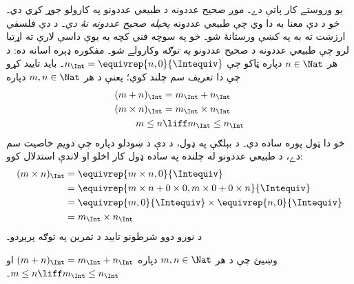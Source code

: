 \documentclass[../../../include/open-logic-section]{subfiles}
\begin{document}
يو وروستے کار پاتې دے۔ موږ صحيح عددونه د طبيعي عددونو په
کارولو جوړ کړي دي۔ خو د دې معنا به دا وي چې طبيعي عددونه \emph{پخپله
صحيح عددونه نۀ دي}۔ د دې فلسفي ارزښت ته به په 
کښې ورستانۀ شو۔ خو په سوچه فني کچه به يوې داسې لارې ته اړتيا لرو
چې طبيعي عددونه د صحيح عددونو \emph{په توګه} وکارولے شو۔ مفکوره
ډېره اسانه ده: د هر $n \in \Nat$ دپاره ټاکو چې
$n_\Int = \equivrep{n, 0}{\Intequiv}$۔ بايد تاييد کړو چې دا تعريف
سم چلند کوي؛ يعنې د هر $m, n \in \Nat$ دپاره
\begin{align*}
	(m + n)_\Int &= m_\Int + n_\Int\\
	(m \times n)_\Int &= m_\Int \times n_\Int\\
	m \leq n &\liff m_\Int \leq n_\Int
\end{align*}
خو دا ټول پوره ساده دي۔ د بېلګې په ډول، د دې د ښودلو دپاره چې
دويم خاصيت سم دے، د طبيعي عددونو له چلنده په ساده ډول کار اخلو او
لاندې استدلال کوو:
	\begin{align*}
		(m \times n)_\Int  &= \equivrep{m \times n, 0}{\Intequiv} \\
		&= \equivrep{m \times n + 0 \times 0, m \times 0 + 0 \times n}{\Intequiv} \\
		&= \equivrep{m, 0}{\Intequiv} \times \equivrep{n, 0}{\Intequiv} \\
		&= m_\Int \times n_\Int
	\end{align*}
د نورو دوو شرطونو تاييد د تمرين په توګه پرېږدو۔
\begin{prob}
	وښيئ چې د هر $m, n \in \Nat$ دپاره $(m + n)_\Int = m_\Int + n_\Int$ او $m \leq n \liff m_\Int \leq n_\Int$۔
\end{prob}
\end{document}
